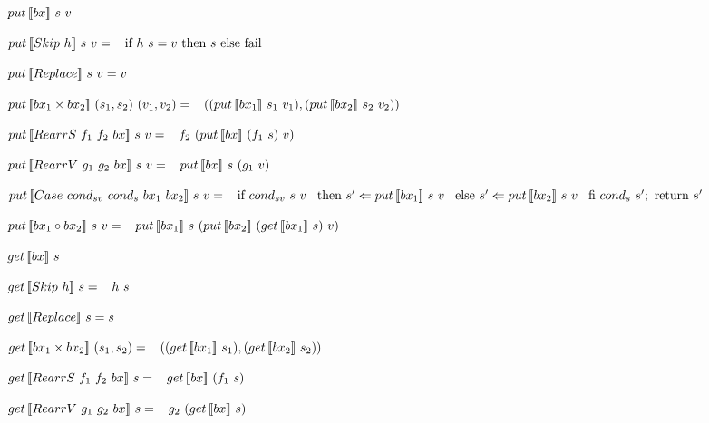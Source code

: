 \begin{multicols}{2}
    \begin{definition}
        $put \, [\![bx]\!] \ s \ v$

        $put \, [\![Skip \ h]\!] \ s \ v = \\
            \hspace*{3mm} \text{if } h \ s = v \text{ then } s \text{ else } \text{fail}$
    
        $put \, [\![Replace]\!] \ s \ v = v$
    
        $put \, [\![bx_1 \times bx_2]\!] \ (s_1, s_2) \ (v_1, v_2) = \\
            \hspace*{3mm} ((put \, [\![bx_1]\!] \ s_1 \ v_1),(put \, [\![bx_2]\!] \ s_2 \ v_2))$
    
        $put \, [\![RearrS \ f_1 \ f_2 \ bx]\!] \ s \ v = \\
            \hspace*{3mm} f_2 \ (put \, [\![bx]\!] \ (f_1 \ s) \ v)$
    
        $put \, [\![RearrV \ g_1 \ g_2 \ bx]\!] \ s \ v = \\
            \hspace*{3mm} put \, [\![bx]\!] \ s \ (g_1 \ v)$
    
        $\putbx{\casebx{cond_{sv}}{cond_{s}}{bx_1}{bx_2}}{s}{v} = \\
            \tab \text{if} \ {cond_{sv} \ s \ v} \\
            \tab \text{then} \ s' \Leftarrow \putbx{bx_1}{s}{v} \\
            \tab \text{else} \ s' \Leftarrow \putbx{bx_2}{s}{v} \\
            \tab \text{fi} \ cond_{s} \ s'; \ \text{return} \ s'$
    
        $\putbx{bx_1 \circ bx_2}{s}{v} = \\
            \tab \putbx{bx_1}{s}{(\putbx{bx_2}{(\getbx{bx_1}{s})}{v})}$
    \end{definition}
\columnbreak
    \begin{definition}
        $get \, [\![bx]\!] \ s$

        $get \, [\![Skip \ h]\!] \ s = \\ 
            \hspace*{3mm} h \ s$

        $get \, [\![Replace]\!] \ s = s$

        $get \, [\![bx_1 \times bx_2]\!] \ (s_1,s_2) = \\
            \hspace*{3mm} ((get \, [\![bx_1]\!] \ s_1),(get \, [\![bx_2]\!] \ s_2))$

        $get \, [\![RearrS \ f_1 \ f_2 \ bx]\!] \ s = \\ 
            \hspace*{3mm} get \, [\![bx]\!] \ (f_1 \ s)$

        $get \, [\![RearrV \ g_1 \ g_2 \ bx]\!] \ s = \\ 
            \hspace*{3mm} g_2 \ (get \, [\![bx]\!] \ s)$


\end{definition}
\end{multicols}
